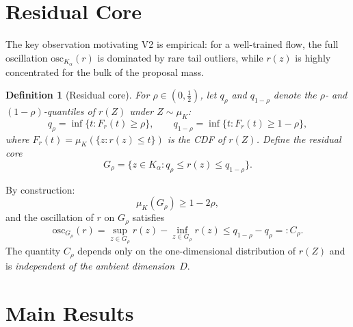 \documentclass[11pt]{article}
\newtheorem{definition}[theorem]{Definition}
\newcommand{\osc}{\mathrm{osc}}
\begin{document}
\section{Residual Core}

The key observation motivating V2 is empirical: for a well-trained flow, the full oscillation $\osc_{K_\alpha}(r)$ is dominated by rare tail outliers, while $r(z)$ is highly concentrated for the bulk of the proposal mass.

\begin{definition}[Residual core]\label{def:core}
For $\rho \in (0, \tfrac{1}{2})$, let $q_\rho$ and $q_{1-\rho}$ denote the $\rho$- and $(1-\rho)$-quantiles of $r(Z)$ under $Z \sim \mu_K$:
\[
  q_\rho = \inf\{t : F_r(t) \ge \rho\}, \qquad q_{1-\rho} = \inf\{t : F_r(t) \ge 1-\rho\},
\]
where $F_r(t) = \mu_K(\{z : r(z) \le t\})$ is the CDF of $r(Z)$. Define the \emph{residual core}
\begin{equation}\label{eq:core}
  G_\rho = \{z \in K_\alpha : q_\rho \le r(z) \le q_{1-\rho}\}.
\end{equation}
\end{definition}

By construction:
\begin{equation}\label{eq:core-mass}
  \mu_K(G_\rho) \ge 1 - 2\rho,
\end{equation}
and the oscillation of $r$ on $G_\rho$ satisfies
\begin{equation}\label{eq:core-osc}
  \osc_{G_\rho}(r) = \sup_{z \in G_\rho} r(z) - \inf_{z \in G_\rho} r(z) \le q_{1-\rho} - q_\rho =: C_\rho.
\end{equation}
The quantity $C_\rho$ depends only on the one-dimensional distribution of $r(Z)$ and is \emph{independent of the ambient dimension~$D$}.


\section{Main Results}

\end{document}
